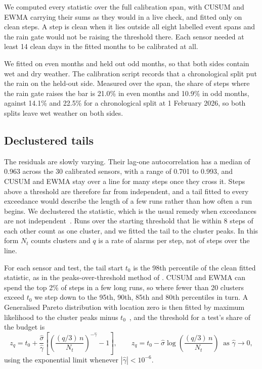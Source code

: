 \documentclass{article}
\begin{document}
We computed every statistic over the full calibration span, with CUSUM and EWMA
carrying their sums as they would in a live check, and fitted only on clean
steps. A step is clean when it lies outside all eight labelled event spans and
the rain gate would not be raising the threshold there. Each sensor needed at
least 14 clean days in the fitted months to be calibrated at all.

We fitted on even months and held out odd months, so that both sides contain
wet and dry weather. The calibration script records that a chronological split
put the rain on the held-out side. Measured over the span, the share of steps
where the rain gate raises the bar is 21.0\% in even months and 10.9\% in odd
months, against 14.1\% and 22.5\% for a chronological split at 1 February 2026,
so both splits leave wet weather on both sides.

\subsection{Declustered tails}
\label{sec:tails}

The residuals are slowly varying. Their lag-one autocorrelation has a median of
0.963 across the 30 calibrated sensors, with a range of 0.701 to 0.993, and
CUSUM and EWMA stay over a line for many steps once they cross it. Steps above a
threshold are therefore far from independent, and a tail fitted to every
exceedance would describe the length of a few runs rather than how often a run
begins. We declustered the statistic, which is the usual remedy when
exceedances are not independent~\citep{coles2001introduction}. Runs over the
starting threshold that lie within 8 steps of each other count as one cluster,
and we fitted the tail to the cluster peaks. In this form $N_{t}$ counts
clusters and $q$ is a rate of alarms per step, not of steps over the line.

For each sensor and test, the tail start $t_{0}$ is the 98th percentile of the
clean fitted statistic, as in the peaks-over-threshold method of
\citet{siffer2017spot}. CUSUM and EWMA can spend the top 2\% of steps in a few
long runs, so where fewer than 20 clusters exceed $t_{0}$ we step down to the
95th, 90th, 85th and 80th percentiles in turn. A Generalised Pareto
distribution with location zero is then fitted by maximum likelihood to the
cluster peaks minus $t_{0}$~\citep{pickands1975gpd}, and the threshold for a
test's share of the budget is
\begin{equation}
  z_{q} = t_{0} + \frac{\hat{\sigma}}{\hat{\gamma}}\left[\left(\frac{(q/3)\, n}{N_{t}}\right)^{-\hat{\gamma}} - 1\right],
  \qquad
  z_{q} = t_{0} - \hat{\sigma} \log\!\left(\frac{(q/3)\, n}{N_{t}}\right) \ \text{ as } \hat{\gamma} \to 0 ,
\end{equation}
using the exponential limit whenever $|\hat{\gamma}| < 10^{-6}$.
\end{document}
